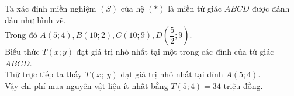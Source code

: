\begin{ex}
{\begin{center}
		\end{center}
		Ta xác định miền nghiệm $\left(S\right)$ của hệ $\left(*\right)$ là miền tứ giác $ABCD$ được đánh dấu như hình vẽ.\\
		Trong đó $A\left(5;4\right), B\left(10;2\right), C\left(10;9\right), D\left(\dfrac{5}{2};9\right)$.\\
		Biểu thức $T\left(x;y\right)$ đạt giá trị nhỏ nhất tại một trong các đỉnh của tứ giác $ABCD$.\\
		Thử trực tiếp ta thấy $T\left(x;\ y\right)$ đạt giá trị nhỏ nhất tại đỉnh $A\left(5; 4\right)$.\\
		Vậy chi phí mua nguyên vật liệu ít nhất bằng $T\left(5;4\right)=34$ triệu đồng.
	} 
\end{ex}

